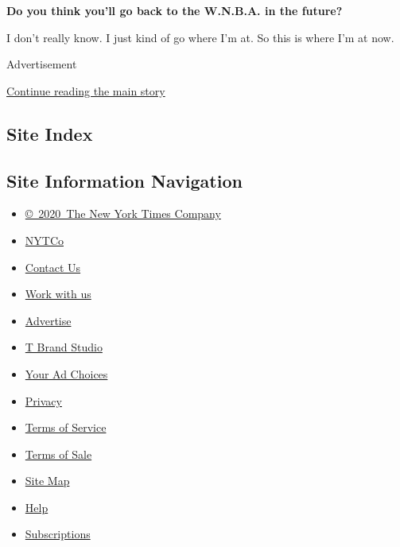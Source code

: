 \textbf{Do you think you'll go back to the W.N.B.A. in the future?}

I don't really know. I just kind of go where I'm at. So this is where
I'm at now.

Advertisement

\protect\hyperlink{after-bottom}{Continue reading the main story}

\hypertarget{site-index}{%
\subsection{Site Index}\label{site-index}}

\hypertarget{site-information-navigation}{%
\subsection{Site Information
Navigation}\label{site-information-navigation}}

\begin{itemize}
\tightlist
\item
  \href{https://help.nytimes3xbfgragh.onion/hc/en-us/articles/115014792127-Copyright-notice}{©~2020~The
  New York Times Company}
\end{itemize}

\begin{itemize}
\tightlist
\item
  \href{https://www.nytco.com/}{NYTCo}
\item
  \href{https://help.nytimes3xbfgragh.onion/hc/en-us/articles/115015385887-Contact-Us}{Contact
  Us}
\item
  \href{https://www.nytco.com/careers/}{Work with us}
\item
  \href{https://nytmediakit.com/}{Advertise}
\item
  \href{http://www.tbrandstudio.com/}{T Brand Studio}
\item
  \href{https://www.nytimes3xbfgragh.onion/privacy/cookie-policy\#how-do-i-manage-trackers}{Your
  Ad Choices}
\item
  \href{https://www.nytimes3xbfgragh.onion/privacy}{Privacy}
\item
  \href{https://help.nytimes3xbfgragh.onion/hc/en-us/articles/115014893428-Terms-of-service}{Terms
  of Service}
\item
  \href{https://help.nytimes3xbfgragh.onion/hc/en-us/articles/115014893968-Terms-of-sale}{Terms
  of Sale}
\item
  \href{https://spiderbites.nytimes3xbfgragh.onion}{Site Map}
\item
  \href{https://help.nytimes3xbfgragh.onion/hc/en-us}{Help}
\item
  \href{https://www.nytimes3xbfgragh.onion/subscription?campaignId=37WXW}{Subscriptions}
\end{itemize}
